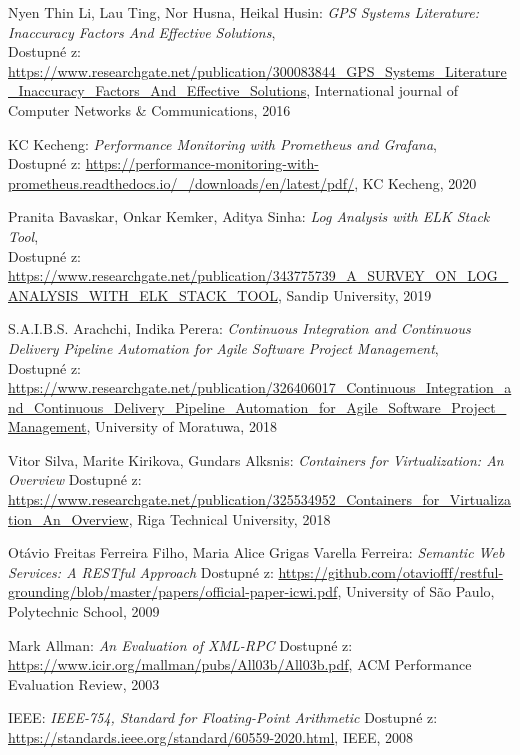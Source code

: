 \documentclass[czech, bachelor]{diploma}
\begin{document}
\begin{thebibliography}{50}
Nyen Thin Li, Lau Ting, Nor Husna, Heikal Husin: \textit{GPS Systems Literature: Inaccuracy Factors And Effective Solutions}, \\
Dostupné z:
\url{https://www.researchgate.net/publication/300083844\_GPS\_Systems\_Literature\_Inaccuracy\_Factors\_And\_Effective\_Solutions},
International journal of Computer Networks \& Communications, 2016

KC Kecheng: \textit{Performance Monitoring with Prometheus and Grafana}, \\
Dostupné z:
\url{https://performance-monitoring-with-prometheus.readthedocs.io/\_/downloads/en/latest/pdf/},
KC Kecheng, 2020

Pranita Bavaskar, Onkar Kemker, Aditya Sinha: \textit{Log Analysis with ELK Stack Tool}, \\
Dostupné z:
\url{https://www.researchgate.net/publication/343775739\_A\_SURVEY\_ON\_LOG\_ANALYSIS\_WITH\_ELK\_STACK\_TOOL},
Sandip University, 2019

S.A.I.B.S. Arachchi, Indika Perera: \textit{Continuous Integration and Continuous Delivery Pipeline Automation for Agile Software
Project Management}, \\
Dostupné z:
\url{https://www.researchgate.net/publication/326406017\_Continuous\_Integration\_and\_Continuous\_Delivery\_Pipeline\_Automation\_for\_Agile\_Software\_Project\_Management},
University of Moratuwa, 2018

Vitor Silva, Marite Kirikova, Gundars Alksnis: \textit{Containers for Virtualization: An Overview}
Dostupné z:
\url{https://www.researchgate.net/publication/325534952\_Containers\_for\_Virtualization\_An\_Overview},
Riga Technical University, 2018

Otávio Freitas Ferreira Filho, Maria Alice Grigas Varella Ferreira: \textit{Semantic Web Services: A RESTful Approach}
Dostupné z:
\url{https://github.com/otaviofff/restful-grounding/blob/master/papers/official-paper-icwi.pdf},
University of São Paulo, Polytechnic School, 2009

Mark Allman: \textit{An Evaluation of XML-RPC}
Dostupné z:
\url{https://www.icir.org/mallman/pubs/All03b/All03b.pdf},
ACM Performance Evaluation Review, 2003

IEEE: \textit{IEEE-754, Standard for Floating-Point Arithmetic}
Dostupné z:
\url{https://standards.ieee.org/standard/60559-2020.html},
IEEE, 2008


\end{thebibliography}
\end{document}
